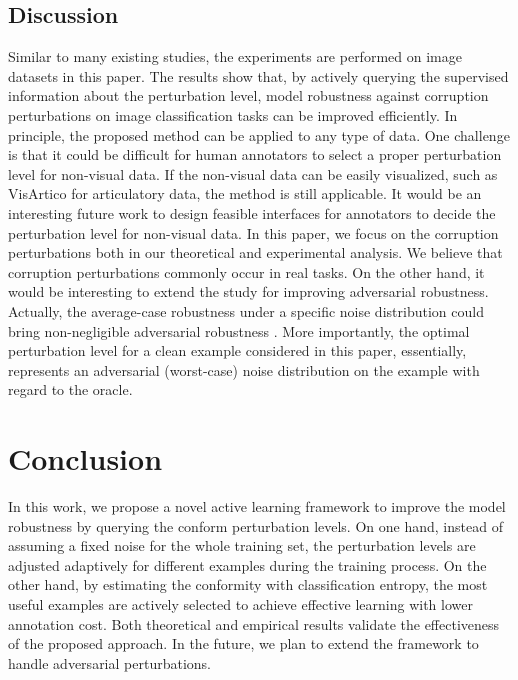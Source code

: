 \documentclass[letterpaper]{article} %
\begin{document}
\vspace{-0.76mm}
\subsection{Discussion}

Similar to many existing studies, the experiments are performed on image datasets in this paper. The results show that, by actively querying the supervised information about the perturbation level, model robustness against corruption perturbations on image classification tasks can be improved efficiently. In principle, the proposed method can be applied to any type of data. One challenge is that it could be difficult for human annotators to select a proper perturbation level for non-visual data. If the non-visual data can be easily visualized, such as VisArtico \cite{ouni2012visartico} for articulatory data, the method is still applicable. It would be an interesting future work to design feasible interfaces for annotators to decide the perturbation level for non-visual data.  In this paper, we focus on the corruption perturbations both in our theoretical and experimental analysis. We believe that corruption perturbations commonly occur in real tasks. On the other hand, it would be interesting to extend the study for improving adversarial robustness. Actually, the average-case robustness under a specific noise distribution could bring non-negligible adversarial robustness \cite{wong2020learning}. More importantly, the optimal perturbation level for a clean example considered in this paper, essentially, represents an adversarial (worst-case) noise distribution on the example with regard to the oracle.


\vspace{-0.76mm}
\section{Conclusion}

In this work, we propose a novel active learning framework to improve the model robustness by querying the conform perturbation levels. On one hand, instead of assuming a fixed noise for the whole training set, the perturbation levels are adjusted adaptively for different examples during the training process. On the other hand, by estimating the conformity with classification entropy, the most useful examples are actively selected to achieve effective learning with lower annotation cost. Both theoretical and empirical results validate the effectiveness of the proposed approach. In the future, we plan to extend the framework to handle adversarial perturbations.
\end{document}
